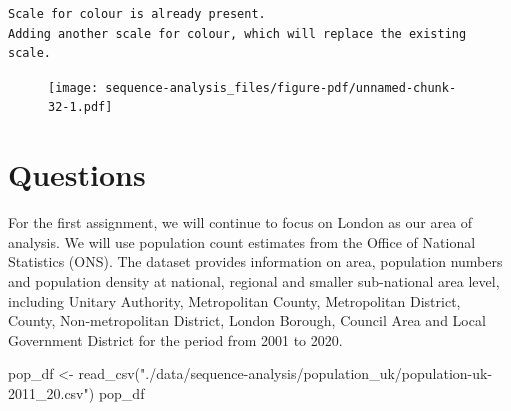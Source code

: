 \documentclass[
  letterpaper,
  DIV=11,
  numbers=noendperiod]{scrreprt}
\newenvironment{Shaded}{\begin{snugshade}}{\end{snugshade}}
\newcommand{\AttributeTok}[1]{\textcolor[rgb]{0.40,0.45,0.13}{#1}}
\newcommand{\CommentTok}[1]{\textcolor[rgb]{0.37,0.37,0.37}{#1}}
\newcommand{\FunctionTok}[1]{\textcolor[rgb]{0.28,0.35,0.67}{#1}}
\newcommand{\NormalTok}[1]{\textcolor[rgb]{0.00,0.23,0.31}{#1}}
\newcommand{\OtherTok}[1]{\textcolor[rgb]{0.00,0.23,0.31}{#1}}
\newcommand{\SpecialCharTok}[1]{\textcolor[rgb]{0.37,0.37,0.37}{#1}}
\newcommand{\StringTok}[1]{\textcolor[rgb]{0.13,0.47,0.30}{#1}}
\begin{document}
\begin{Shaded}
\end{Shaded}

\begin{verbatim}
Scale for colour is already present.
Adding another scale for colour, which will replace the existing scale.
\end{verbatim}

\begin{figure}[H]

{\centering \texttt{[image: sequence-analysis\_files/figure-pdf/unnamed-chunk-32-1.pdf]}

}

\end{figure}

\hypertarget{questions-1}{%
\section{Questions}\label{questions-1}}

For the first assignment, we will continue to focus on London as our
area of analysis. We will use population count estimates from the Office
of National Statistics (ONS). The dataset provides information on area,
population numbers and population density at national, regional and
smaller sub-national area level, including Unitary Authority,
Metropolitan County, Metropolitan District, County, Non-metropolitan
District, London Borough, Council Area and Local Government District for
the period from 2001 to 2020.

\begin{Shaded}
\begin{Highlighting}[]
\NormalTok{pop\_df }\OtherTok{\textless{}{-}} \FunctionTok{read\_csv}\NormalTok{(}\StringTok{"./data/sequence{-}analysis/population\_uk/population{-}uk{-}2011\_20.csv"}\NormalTok{)}
\NormalTok{pop\_df}
\end{Highlighting}
\end{Shaded}
\end{document}
